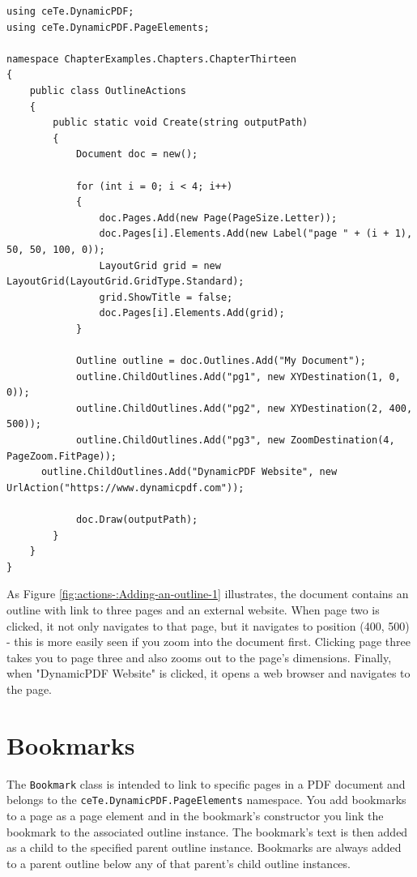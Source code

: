 \documentclass[american,letterpaper]{tufte-book}
\numberwithin{equation}{section}
\numberwithin{figure}{section}
\begin{document}
{\bgroup{}
\begin{lstlisting}[caption={Outline actions.},label={lis:illus-out-acti-A-PDF-document-1},basicstyle={\small\ttfamily},breaklines=true]
using ceTe.DynamicPDF;
using ceTe.DynamicPDF.PageElements;

namespace ChapterExamples.Chapters.ChapterThirteen
{
    public class OutlineActions
    {
        public static void Create(string outputPath)
        {
            Document doc = new();

            for (int i = 0; i < 4; i++)
            {
                doc.Pages.Add(new Page(PageSize.Letter));
                doc.Pages[i].Elements.Add(new Label("page " + (i + 1), 50, 50, 100, 0));
                LayoutGrid grid = new LayoutGrid(LayoutGrid.GridType.Standard);
                grid.ShowTitle = false;
                doc.Pages[i].Elements.Add(grid);
            }

            Outline outline = doc.Outlines.Add("My Document");
            outline.ChildOutlines.Add("pg1", new XYDestination(1, 0, 0));
            outline.ChildOutlines.Add("pg2", new XYDestination(2, 400, 500));
            outline.ChildOutlines.Add("pg3", new ZoomDestination(4, PageZoom.FitPage));
      outline.ChildOutlines.Add("DynamicPDF Website", new UrlAction("https://www.dynamicpdf.com"));
        
            doc.Draw(outputPath);
        }
    }
}
\end{lstlisting}
\leavevmode\egroup

As Figure \ref{fig:actions-:Adding-an-outline-1} illustrates, the
document contains an outline with link to three pages and an external
website. When page two is clicked, it not only navigates to that page,
but it navigates to position (400, 500) - this is more easily seen
if you zoom into the document first. Clicking page three takes you
to page three and also zooms out to the page's dimensions. Finally,
when "DynamicPDF Website" is clicked, it opens a web browser and
navigates to the page.

\section{Bookmarks}

The \texttt{Bookmark} class is intended to link to specific pages
in a PDF document and belongs to the \texttt{ceTe.DynamicPDF.PageElements}
namespace. You add bookmarks to a page as a page element and in the
bookmark's constructor you link the bookmark to the associated outline
instance. The bookmark's text is then added as a child to the specified
parent outline instance. Bookmarks are always added to a parent outline
below any of that parent's child outline instances. 

}
\end{document}
